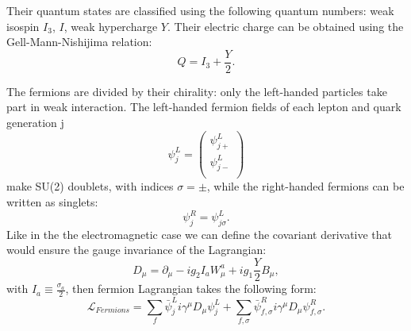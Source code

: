 Their quantum states are classified using the following quantum numbers: weak isospin $I_3$, $I$, weak hypercharge $Y$. Their electric charge can be obtained using the Gell-Mann-Nishijima relation:
  \begin{equation}
Q = I_3+\frac{Y}{2}.
\end{equation}

The fermions are divided by their chirality: only the left-handed particles take part in weak interaction. The left-handed fermion fields of each lepton and quark generation j
  \begin{equation}
    \psi^L_j = \begin{pmatrix}
	\psi^L_{j+}  \\
	\psi^L_{j-}  \\
\end{pmatrix}
  \end{equation}
make SU(2) doublets, with indices $\sigma=\pm$, while the right-handed fermions can be written as singlets:
 \begin{equation}
\psi^R_j = \psi^L_{j\sigma}.  
\end{equation}
Like in the the electromagnetic case we can define the covariant derivative that would ensure the gauge invariance of the Lagrangian:
 \begin{equation}
D_\mu = \partial_{\mu} - ig_2I_aW^a_{\mu}+ig_1\frac{Y}{2}B_{\mu},
\end{equation}
with $I_a \equiv \frac{\sigma_a}{2}$, then fermion Lagrangian takes the following form:
 \begin{equation}
\mathcal{L}_{Fermions} = \sum_f \bar \psi^L_j i \gamma^{\mu}D_{\mu}\psi^L_j +\sum_{f,\sigma} \bar \psi^R_{f,\sigma}  i \gamma^{\mu}D_{\mu}\psi^R_{f,\sigma}  .
\end{equation}

